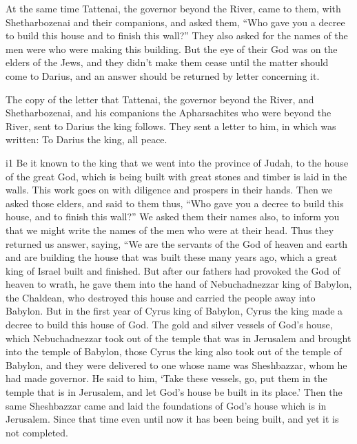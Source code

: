  At the same time Tattenai, the governor beyond the River,
came to them, with Shetharbozenai and their companions, and asked them,
``Who gave you a decree to build this house and to finish this wall?''
 They also asked for the names of the men were who were
making this building.  But the eye of their God was on the
elders of the Jews, and they didn't make them cease until the matter
should come to Darius, and an answer should be returned by letter
concerning it.

 The copy of the letter that Tattenai, the governor beyond
the River, and Shetharbozenai, and his companions the Apharsachites who
were beyond the River, sent to Darius the king follows. 
They sent a letter to him, in which was written: To Darius the king, all
peace.

i1 Be it known to the king that we went into the province of
Judah, to the house of the great God, which is being built with great
stones and timber is laid in the walls. This work goes on with diligence
and prospers in their hands.  Then we asked those elders,
and said to them thus, ``Who gave you a decree to build this house, and
to finish this wall?''  We asked them their names also, to
inform you that we might write the names of the men who were at their
head.  Thus they returned us answer, saying, ``We are the
servants of the God of heaven and earth and are building the house that
was built these many years ago, which a great king of Israel built and
finished.  But after our fathers had provoked the God of
heaven to wrath, he gave them into the hand of Nebuchadnezzar king of
Babylon, the Chaldean, who destroyed this house and carried the people
away into Babylon.  But in the first year of Cyrus king of
Babylon, Cyrus the king made a decree to build this house of God.
 The gold and silver vessels of God's house, which
Nebuchadnezzar took out of the temple that was in Jerusalem and brought
into the temple of Babylon, those Cyrus the king also took out of the
temple of Babylon, and they were delivered to one whose name was
Sheshbazzar, whom he had made governor.  He said to him,
`Take these vessels, go, put them in the temple that is in Jerusalem,
and let God's house be built in its place.'  Then the same
Sheshbazzar came and laid the foundations of God's house which is in
Jerusalem. Since that time even until now it has been being built, and
yet it is not completed.

